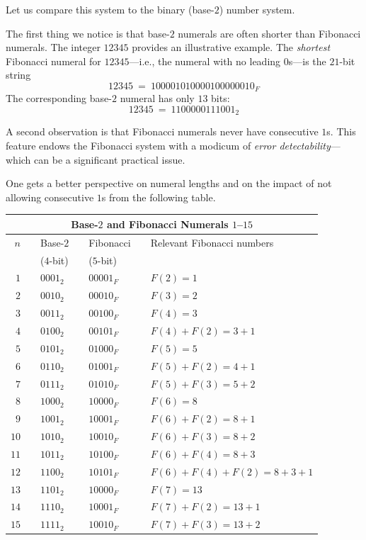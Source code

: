 \smallskip

Let us compare this system to the binary (base-$2$) number system.

The first thing we notice is that base-$2$ numerals are often shorter than Fibonacci numerals. The integer $12345$ provides an illustrative example.  The {\em shortest} Fibonacci numeral for $12345$---i.e., the numeral with no leading $0$s---is the $21$-bit string
\[ 12345 \ = \ 1 00001 01000 01000 00010_F \]
The corresponding base-$2$ numeral has only $13$ bits:
\[ 12345 \ = \ 110 00001 11001_2 \]

\medskip
A second observation is that Fibonacci numerals never have consecutive $1$s.  This feature endows the Fibonacci system with a modicum of {\em error detectability}---which can be a significant practical issue.

\medskip

One gets a better perspective on numeral lengths and on the impact of not allowing consecutive $1$s from the following table.

\smallskip

\begin{tabular}{|rclclcl|}
\multicolumn{7}{c}{\sf Base-$2$ and Fibonacci Numerals $1$--$15$} \\
\hline
$n$ & & Base-$2$  & & Fibonacci  & & Relevant Fibonacci numbers \\
       & & ($4$-bit)    & & ($5$-bit)   & & \\
\hline
\hline
$1$ & & $0001_2$ & & $00001_F$ & & $F(2) =1$ \\
\hline
$2$ & & $0010_2$ & & $00010_F$ & & $F(3) = 2$ \\
\hline
$3$ & & $0011_2$ & &  $00100_F$ & & $F(4) = 3$ \\
\hline
$4$ & & $0100_2$ & &  $00101_F$ & & $F(4) + F(2) = 3+1$ \\ 
\hline
$5$ & & $0101_2$ & &  $01000_F$ & & $F(5) = 5$ \\
\hline
$6$ & & $0110_2$ & &  $01001_F$ & & $F(5) + F(2) = 4+1$ \\
\hline 
$7$ & & $0111_2$ & &  $01010_F$ & &  $F(5) + F(3) = 5+2$ \\
\hline 
$8$ & & $1000_2$ & & $10000_F$ & &  $F(6) = 8$ \\ 
\hline
$9$ & & $1001_2$ & & $10001_F$ & &  $F(6) + F(2) = 8 +1$ \\ 
\hline
$10$ & & $1010_2$ & & $10010_F$ & &  $F(6) + F(3) = 8 +2$ \\ 
\hline
$11$ & & $1011_2$ & & $10100_F$ & &  $F(6) + F(4) = 8 +3$ \\ 
\hline
$12$ & & $1100_2$ & & $10101_F$ & &  $F(6) + F(4) + F(2) = 8 +3 +1$ \\ 
\hline
$13$ & & $1101_2$ & & $10000_F$ & &  $F(7) = 13$ \\ 
\hline
$14$ & & $1110_2$ & & $10001_F$ & &  $F(7)  + F(2) = 13 +1$ \\ 
\hline
$15$ & & $1111_2$ & & $10010_F$ & &  $F(7) + F(3) = 13 +2$ \\ 
\hline
\end{tabular}
 
